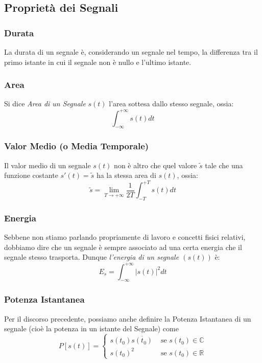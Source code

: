 \subsection{Proprietà dei Segnali}
\subsubsection{Durata}
La durata di un segnale è, considerando un segnale nel tempo, la differenza tra il primo istante in cui il segnale non è nullo e l'ultimo istante.

\subsubsection{Area}
Si dice \textit{Area di un Segnale} $s(t)$ l'area sottesa dallo stesso segnale, ossia:
\begin{equation}
    \int_{-\infty}^{+\infty} s(t)dt
\end{equation}

\subsubsection{Valor Medio (o Media Temporale)}
Il valor medio di un segnale $s(t)$ non è altro che quel valore $\tilde{s}$ tale che una funzione costante $s'(t) = \tilde{s}$ ha la stessa area di $s(t)$, ossia:
\begin{equation}
    \tilde{s} = \lim_{T \rightarrow +\infty} \frac{1}{2T} \int_{-T}^{+T}s(t)dt
\end{equation}

\subsubsection{Energia}
Sebbene non stiamo parlando propriamente di lavoro e concetti fisici relativi, dobbiamo dire che un segnale è sempre associato ad una certa energia che il segnale stesso trasporta.
Dunque \textit{l'energia di un segnale $(s(t))$} è:
\begin{equation}
    E_s = \int_{-\infty}^{+\infty} |s(t)|^2 dt
\end{equation}

\subsubsection{Potenza Istantanea}
Per il discorso precedente, possiamo anche definire la Potenza Istantanea di un segnale (cioè la potenza in un istante del Segnale) come
\begin{equation}
    P[s(t)] = \begin{cases}
        s(t_0)\overline{s(t_0)} & \mbox{ se } s(t_0) \in \mathbb{C} \\
        s(t_0)^2 & \mbox{ se } s(t_0) \in \mathbb{R}
    \end{cases}
\end{equation}


